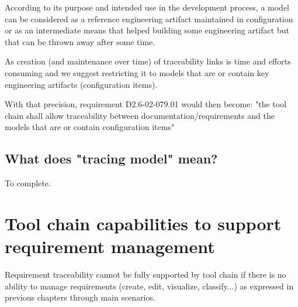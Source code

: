 \documentclass[11pt]{template/openetcs_report}
\begin{document}
According to its purpose and intended use in the development process, a model can be considered as a reference engineering artifact maintained in configuration or as an intermediate means that helped building some engineering artifact but that can be thrown away after some time.

As creation (and maintenance over time) of traceability links is time and efforts consuming and we suggest restricting it to models that are or contain key engineering artifacts (configuration items).

With that precision, requirement D2.6-02-079.01 would then become: "the tool chain shall allow traceability between documentation/requirements and the models that are or contain configuration items"

\subsection{What does "tracing model" mean?}
To complete.

\section{Tool chain capabilities to support requirement management}
Requirement traceability cannot be fully supported by tool chain if there is no ability to manage requirements (create, edit, visualize, classify...) as expressed in previous chapters through main scenarios.
\end{document}
